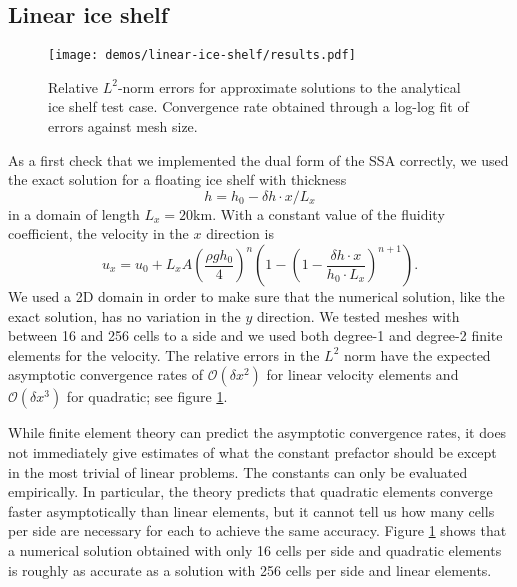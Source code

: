\documentclass{article}
\theoremstyle{definition}
\theoremstyle{plain}
\begin{document}
\subsection{Linear ice shelf} \label{sec:linear-ice-shelf}

\begin{figure}[h]
    \begin{center}
        \texttt{[image: demos/linear-ice-shelf/results.pdf]}
    \end{center}
    \caption{Relative $L^2$-norm errors for approximate solutions to the analytical ice shelf test case.
    Convergence rate obtained through a log-log fit of errors against mesh size.}
    \label{fig:linear-ice-shelf-convergence-rate}
\end{figure}

As a first check that we implemented the dual form of the SSA correctly, we used the exact solution for a floating ice shelf with thickness
\begin{equation}
    h = h_0 - \delta h \cdot x / L_x
\end{equation}
in a domain of length $L_x = 20$km.
With a constant value of the fluidity coefficient, the velocity in the $x$ direction is
\begin{equation}
    u_x = u_0 + L_x A \left(\frac{\rho g h_0}{4}\right)^n\left(1 - \left(1 - \frac{\delta h \cdot x}{h_0\cdot L_x}\right)^{n + 1}\right).
\end{equation}
We used a 2D domain in order to make sure that the numerical solution, like the exact solution, has no variation in the $y$ direction.
We tested meshes with between 16 and 256 cells to a side and we used both degree-1 and degree-2 finite elements for the velocity.
The relative errors in the $L^2$ norm have the expected asymptotic convergence rates of $\mathscr{O}(\delta x^2)$ for linear velocity elements and $\mathscr{O}(\delta x^3)$ for quadratic; see figure \ref{fig:linear-ice-shelf-convergence-rate}.

While finite element theory can predict the asymptotic convergence rates, it does not immediately give estimates of what the constant prefactor should be except in the most trivial of linear problems.
The constants can only be evaluated empirically.
In particular, the theory predicts that quadratic elements converge faster asymptotically than linear elements, but it cannot tell us how many cells per side are necessary for each to achieve the same accuracy.
Figure \ref{fig:linear-ice-shelf-convergence-rate} shows that a numerical solution obtained with only 16 cells per side and quadratic elements is roughly as accurate as a solution with 256 cells per side and linear elements.
\end{document}
